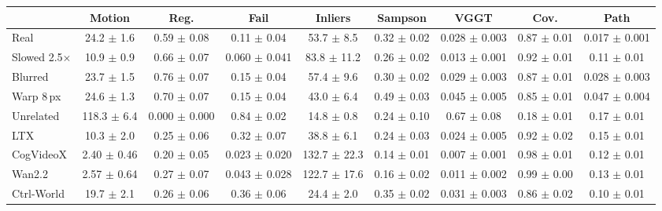 \begin{tabular}{lcccccccc}
\toprule
 & Motion & Reg. & Fail & Inliers & Sampson & VGGT & Cov. & Path \\
\midrule
Real & 24.2 $\pm$ 1.6 & 0.59 $\pm$ 0.08 & 0.11 $\pm$ 0.04 & 53.7 $\pm$ 8.5 & 0.32 $\pm$ 0.02 & 0.028 $\pm$ 0.003 & 0.87 $\pm$ 0.01 & 0.017 $\pm$ 0.001 \\
Slowed 2.5$\times$ & 10.9 $\pm$ 0.9 & 0.66 $\pm$ 0.07 & 0.060 $\pm$ 0.041 & 83.8 $\pm$ 11.2 & 0.26 $\pm$ 0.02 & 0.013 $\pm$ 0.001 & 0.92 $\pm$ 0.01 & 0.11 $\pm$ 0.01 \\
Blurred & 23.7 $\pm$ 1.5 & 0.76 $\pm$ 0.07 & 0.15 $\pm$ 0.04 & 57.4 $\pm$ 9.6 & 0.30 $\pm$ 0.02 & 0.029 $\pm$ 0.003 & 0.87 $\pm$ 0.01 & 0.028 $\pm$ 0.003 \\
Warp 8\,px & 24.6 $\pm$ 1.3 & 0.70 $\pm$ 0.07 & 0.15 $\pm$ 0.04 & 43.0 $\pm$ 6.4 & 0.49 $\pm$ 0.03 & 0.045 $\pm$ 0.005 & 0.85 $\pm$ 0.01 & 0.047 $\pm$ 0.004 \\
Unrelated & 118.3 $\pm$ 6.4 & 0.000 $\pm$ 0.000 & 0.84 $\pm$ 0.02 & 14.8 $\pm$ 0.8 & 0.24 $\pm$ 0.10 & 0.67 $\pm$ 0.08 & 0.18 $\pm$ 0.01 & 0.17 $\pm$ 0.01 \\
\midrule
LTX & 10.3 $\pm$ 2.0 & 0.25 $\pm$ 0.06 & 0.32 $\pm$ 0.07 & 38.8 $\pm$ 6.1 & 0.24 $\pm$ 0.03 & 0.024 $\pm$ 0.005 & 0.92 $\pm$ 0.02 & 0.15 $\pm$ 0.01 \\
CogVideoX & 2.40 $\pm$ 0.46 & 0.20 $\pm$ 0.05 & 0.023 $\pm$ 0.020 & 132.7 $\pm$ 22.3 & 0.14 $\pm$ 0.01 & 0.007 $\pm$ 0.001 & 0.98 $\pm$ 0.01 & 0.12 $\pm$ 0.01 \\
Wan2.2 & 2.57 $\pm$ 0.64 & 0.27 $\pm$ 0.07 & 0.043 $\pm$ 0.028 & 122.7 $\pm$ 17.6 & 0.16 $\pm$ 0.02 & 0.011 $\pm$ 0.002 & 0.99 $\pm$ 0.00 & 0.13 $\pm$ 0.01 \\
Ctrl-World & 19.7 $\pm$ 2.1 & 0.26 $\pm$ 0.06 & 0.36 $\pm$ 0.06 & 24.4 $\pm$ 2.0 & 0.35 $\pm$ 0.02 & 0.031 $\pm$ 0.003 & 0.86 $\pm$ 0.02 & 0.10 $\pm$ 0.01 \\
\bottomrule
\end{tabular}
